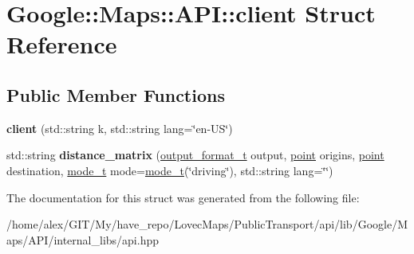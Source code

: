 \hypertarget{structGoogle_1_1Maps_1_1API_1_1client}{}\section{Google\+:\+:Maps\+:\+:A\+PI\+:\+:client Struct Reference}
\label{structGoogle_1_1Maps_1_1API_1_1client}
\subsection*{Public Member Functions}
\begin{DoxyCompactItemize}
\item 
\mbox{\label{structGoogle_1_1Maps_1_1API_1_1client_aa4e453192444e3ed3ae486036e852f03}} 
{\bfseries client} (std\+::string k, std\+::string lang=\char`\"{}en-\/US\char`\"{})
\item 
\mbox{\label{structGoogle_1_1Maps_1_1API_1_1client_a2167437cf0c3cdc7fa9e9c70643a27f4}} 
std\+::string {\bfseries distance\+\_\+matrix} (\hyperlink{structGoogle_1_1Maps_1_1API_1_1output__format__t}{output\+\_\+format\+\_\+t} output, \hyperlink{structGoogle_1_1Maps_1_1point}{point} origins, \hyperlink{structGoogle_1_1Maps_1_1point}{point} destination, \hyperlink{structGoogle_1_1Maps_1_1API_1_1mode__t}{mode\+\_\+t} mode=\hyperlink{structGoogle_1_1Maps_1_1API_1_1mode__t}{mode\+\_\+t}(\char`\"{}driving\char`\"{}), std\+::string lang=\char`\"{}\char`\"{})
\end{DoxyCompactItemize}


The documentation for this struct was generated from the following file\+:\begin{DoxyCompactItemize}
\item 
/home/alex/\+G\+I\+T/\+My/have\+\_\+repo/\+Lovec\+Maps/\+Public\+Transport/api/lib/\+Google/\+Maps/\+A\+P\+I/internal\+\_\+libs/api.\+hpp\end{DoxyCompactItemize}
